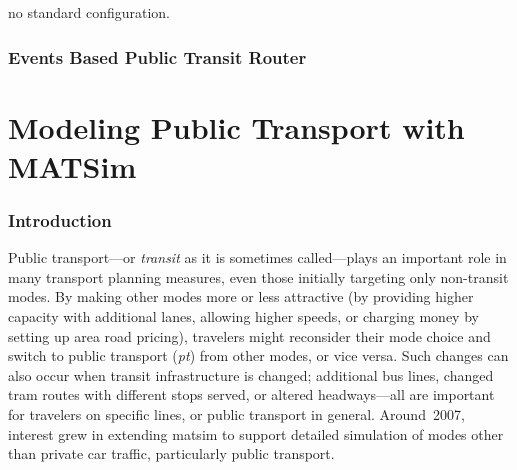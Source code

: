 

\createStandardInformationBasic%
{}%
{}%
{no standard configuration.}%
{\citet{Ordonez_HKSTS_2011}}

\subsection{Events Based Public Transit Router}

\chapter{Modeling Public Transport with MATSim}
\subsection{Introduction}
Public transport---or \emph{transit} as it is sometimes called---plays
an important role in many transport planning measures, even those initially
targeting only non-transit modes. By making other modes more or less
attractive (\eg by providing higher capacity with additional lanes, allowing
higher speeds, or charging money by setting up area road pricing), travelers
might reconsider their mode choice and switch to public transport (\emph{pt})
from other modes, or vice versa. Such changes can also occur when transit
infrastructure is changed; additional bus lines, changed tram routes with
different stops served, or altered headways---all are important for travelers
on specific lines, or public transport in general. Around~2007,
interest grew in extending \gls{matsim} to support detailed simulation of 
modes other than private car traffic, particularly public transport.

